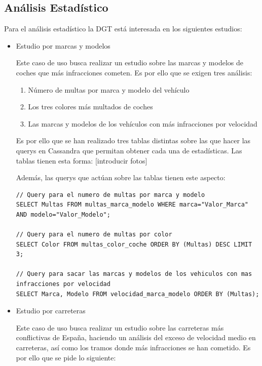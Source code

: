 \documentclass[]{article}
\begin{document}
\subsection{Análisis Estadístico}
\label{subsec:analisis_estadistico}

Para el análisis estadístico la DGT está interesada en los siguientes estudios:
\begin{itemize}
    \item Estudio por marcas y modelos

    Este caso de uso busca realizar un estudio sobre las marcas y modelos de coches que más infracciones cometen. Es por ello que se exigen tres análisis:
    
    \begin{enumerate}
        \item Número de multas por marca y modelo del vehículo
        \item Los tres colores más multados de coches
        \item Las marcas y modelos de los vehículos con más infracciones por velocidad
    \end{enumerate}

    Es por ello que se han realizado tres tablas distintas sobre las que hacer las querys en Cassandra que permitan obtener cada una de estadísticas. Las tablas tienen esta forma: [introducir fotos]

    Además, las querys que actúan sobre las tablas tienen este aspecto:

    \lstset{style=cql}
    \begin{lstlisting}[language=cql, caption=Querys para el caso de uso 1]
// Query para el numero de multas por marca y modelo
SELECT Multas FROM multas_marca_modelo WHERE marca="Valor_Marca" AND modelo="Valor_Modelo";

// Query para el numero de multas por color
SELECT Color FROM multas_color_coche ORDER BY (Multas) DESC LIMIT 3;

// Query para sacar las marcas y modelos de los vehiculos con mas infracciones por velocidad
SELECT Marca, Modelo FROM velocidad_marca_modelo ORDER BY (Multas);
    \end{lstlisting}

    \item Estudio por carreteras

    Este caso de uso busca realizar un estudio sobre las carreteras más conflictivas de España, haciendo un análisis del exceso de velocidad medio en carreteras, así como los tramos donde más infracciones se han cometido. Es por ello que se pide lo siguiente:


\end{itemize}
\end{document}
